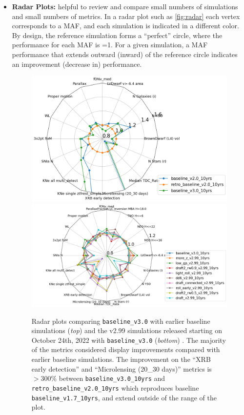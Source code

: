 \begin{itemize}

\item {\bf Radar Plots:} helpful to review and compare small numbers of simulations and small numbers of metrics. In a radar plot such as \autoref{fig:radar} each vertex corresponds to a MAF, and each simulation is indicated in a different color. By design, the reference simulation forms a ``perfect'' circle, where the performance for each MAF is =1. For a given simulation, a MAF performance that extends outward (inward) of the reference circle indicates an improvement (decrease in) performance. 

\begin{figure}[h!]
\centering
\includegraphics[height=0.4\textwidth]{figures/SCOC299radar1.png}
\includegraphics[height=0.4\textwidth]{figures/SCOC299radar2.png}
\caption{Radar plots comparing  \texttt{baseline\_v3.0} with earlier baseline simulations (\emph{top}) and the v2.99 simulations released starting on October 24th, 2022 with \texttt{baseline\_v3.0} (\emph{bottom}) . The majority of the metrics considered display improvements compared with earlier baseline simulations. The improvement on the ``XRB early detection'' and ``Microlensing (20\_30 days)'' metrics is $>300\%$ between \texttt{baseline\_v3.0\_10yrs} and \texttt{retro\_baseline\_v2.0\_10yrs} which reproduces baseline \texttt{baseline\_v1.7\_10yrs}, and extend outside of the range of the plot.}\label{fig:radar}
\end{figure}
\FloatBarrier


\end{itemize}
